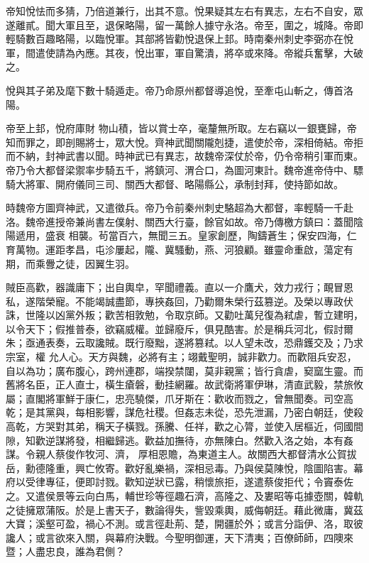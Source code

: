 \begin{pinyinscope}
 帝知悅怯而多猜，乃倍道兼行，出其不意。悅果疑其左右有異志，左右不自安，眾遂離貳。聞大軍且至，退保略陽，留一萬餘人據守永洛。帝至，圍之，城降。帝即輕騎數百趣略陽，以臨悅軍。其部將皆勸悅退保上邽。時南秦州刺史李弼亦在悅軍，間遣使請為內應。其夜，悅出軍，軍自驚潰，將卒或來降。帝縱兵奮擊，大破之。



 悅與其子弟及麾下數十騎遁走。帝乃命原州都督導追悅，至牽屯山斬之，傳首洛陽。



 帝至上邽，悅府庫財
 物山積，皆以賞士卒，毫釐無所取。左右竊以一銀甕歸，帝知而罪之，即剖賜將士，眾大悅。齊神武聞關隴剋捷，遣使於帝，深相倚結。帝拒而不納，封神武書以聞。時神武已有異志，故魏帝深仗於帝，仍令帝稍引軍而東。帝乃令大都督梁禦率步騎五千，將鎮河、渭合口，為圖河東計。魏帝進帝侍中、驃騎大將軍、開府儀同三司、關西大都督、略陽縣公，承制封拜，使持節如故。



 時魏帝方圖齊神武，又遣徵兵。帝乃令前秦州刺史駱超為大都督，率輕騎一千赴洛。魏帝進授帝兼尚書左僕射、關西大行臺，餘官如故。帝乃傳檄方鎮曰：蓋聞陰陽遞用，盛衰
 相襲。茍當百六，無聞三五。皇家創歷，陶鑄蒼生；保安四海，仁育萬物。運距孝昌，屯沴屢起，隴、冀騷動，燕、河狼顧。雖靈命重啟，蕩定有期，而乘釁之徒，因翼生羽。



 賊臣高歡，器識庸下；出自輿皁，罕聞禮義。直以一介鷹犬，效力戎行；靦冒恩私，遂階榮寵。不能竭誠盡節，專挾姦回，乃勸爾朱榮行茲篡逆。及榮以專政伏誅，世隆以凶黨外叛；歡苦相敦勉，令取京師。又勸吐萬兒復為弒虐，暫立建明，以令天下；假推普泰，欲竊威權。並歸廢斥，俱見酷害。於是稱兵河北，假討爾朱；亟通表奏，云取讒賊。既行廢黜，遂將篡弒。以人望未改，恐鼎鑊交及；乃求宗室，權
 允人心。天方與魏，必將有主；翊戴聖明，誠非歡力。而歡阻兵安忍，自以為功；廣布腹心，跨州連郡，端揆禁闥，莫非親黨；皆行貪虐，窫窳生靈。而舊將名臣，正人直士，橫生瘡磐，動挂網羅。故武衛將軍伊琳，清直武毅，禁旅攸屬；直閣將軍鮮于康仁，忠亮驍傑，爪牙斯在：歡收而戮之，曾無聞奏。司空高乾；是其黨與，每相影響，謀危社稷。但姦志未從，恐先泄漏，乃密白朝廷，使殺高乾，方哭對其弟，稱天子橫戮。孫騰、任祥，歡之心膂，並使入居樞近，伺國間隙，知歡逆謀將發，相繼歸逃。歡益加撫待，亦無陳白。然歡入洛之始，本有姦謀。令親人蔡俊作牧河、濟，
 厚相恩贍，為東道主人。故關西大都督清水公賀拔岳，勳德隆重，興亡攸寄。歡好亂樂禍，深相忌毒。乃與侯莫陳悅，陰圖陷害。幕府以受律專征，便即討戮。歡知逆狀已露，稍懷旅拒，遂遣蔡俊拒代；令竇泰佐之。又遣侯景等云向白馬，輔世珍等徑趣石濟，高隆之、及婁昭等屯據壺關，韓軌之徒擁眾蒲阪。於是上書天子，數論得失，訾毀乘輿，威侮朝廷。藉此微庸，冀茲大寶；溪壑可盈，禍心不測。或言徑赴荊、楚，開疆於外；或言分詣伊、洛，取彼讒人；或言欲來入關，與幕府決戰。今聖明御運，天下清夷；百僚師師，四隩來暨；人盡忠良，誰為君側？




\end{pinyinscope}
